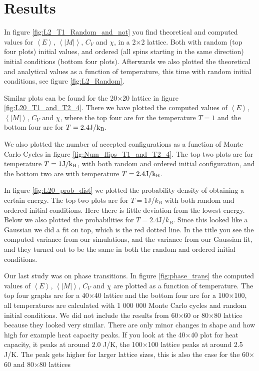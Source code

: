 \documentclass[reprint, english,notitlepage,nofootinbib]{revtex4-1}  %
\begin{document}
\section{Results}

In figure \ref{fig:L2_T1_Random_and_not} you find theoretical and computed values for $\left<E\right>$, $\left<|M|\right>$, $C_V$ and $\chi$, in a 2$\times$2 lattice. Both with random (top four plots) initial values, and ordered (all spins starting in the same direction) initial conditions (bottom four plots). Afterwards we also plotted the theoretical and analytical values as a function of temperature, this time with random initial conditions, see figure \ref{fig:L2_Random}.

Similar plots can be found for the 20$\times$20 lattice in figure \ref{fig:L20_T1_and_T2_4}. There we have plotted the computed values of $\left<E\right>$, $\left<|M|\right>$, $C_V$ and $\chi$, where the top four are for the temperature $T=1$ and the bottom four are for $T=2.4\rm{J}/k_B$.

We also plotted the number of accepted configurations as a function of Monte Carlo Cycles in figure \ref{fig:Num_flips_T1_and_T2_4}. The top two plots are for temperature $T=1\rm{J}/k_B$, with both random and ordered initial configuration, and the bottom two are with temperature $T=2.4\rm{J}/k_B$.

In figure \ref{fig:L20_prob_dist} we plotted the probability density of obtaining a certain energy. The top two plots are for $T = 1$J/$k_B$ with both random and ordered initial conditions. Here there is little deviation from the lowest energy. Below we also plotted the probabilities for $T = 2.4$J/$k_B$. Since this looked like a Gaussian we did a fit on top, which is the red dotted line. In the title you see the computed variance from our simulations, and the variance from our Gaussian fit, and they turned out to be the same in both the random and ordered initial conditions.

Our last study was on phase transitions. In figure \ref{fig:phase_trans} the computed values of $\left<E\right>$, $\left<|M|\right>$, $C_V$ and $\chi$ are plotted as a function of temperature. The top four graphs are for a 40$\times$40 lattice and the bottom four are for a 100$\times$100, all temperatures are calculated with 1 000 000 Monte Carlo cycles and random initial conditions. We did not include the results from 60$\times$60 or 80$\times$80 lattice because they looked very similar. There are only minor changes in shape and how high for example heat capacity peaks. If you look at the 40$\times$40 plot for heat capacity, it peaks at around 2.0 J/K, the 100$\times$100 lattice peaks at around 2.5 J/K. The peak gets higher for larger lattice sizes, this is also the case for the 60$\times$60 and 80$\times$80 lattices
\end{document}
